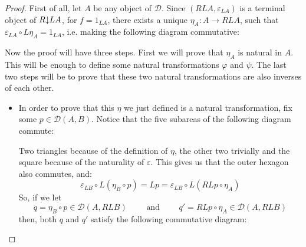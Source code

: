 \begin{proof} First of all, let $A$ be any object of $\mathcal{D}$. Since $(RLA,\varepsilon_{LA})$ is a terminal object of $\commaCat{R}{LA}$, for $f=1_{LA}$, there exists a unique $\eta_A:A\to RLA$, such that $\varepsilon_{LA}\circ L\eta_A=1_{LA}$, i.e. making the following diagram commutative:
\begin{center}
\end{center}
Now the proof will have three steps. First we will prove that $\eta_A$ is natural in $A$. This will be enough to define some natural transformations $\varphi$ and $\psi$. The last two steps will be to prove that these two natural transformations are also inverses of each other.
\begin{itemize}
\item In order to prove that this $\eta$ we just defined is a natural transformation, fix some $p\in\mathcal{D}(A,B)$. Notice that the five subareas of the following diagram commute:
\begin{center}
\end{center}
Two triangles because of the definition of $\eta$, the other two trivially and the square because of the naturality of $\varepsilon$. This gives us that the outer hexagon also commutes, and:
\[\varepsilon_{LB}\circ L(\eta_B\circ p)=Lp=\varepsilon_{LB}\circ L(RLp\circ\eta_A)\]
So, if we let
\[q=\eta_B\circ p\in\mathcal{D}(A,RLB)\qquad\text{ and }\qquad q'=RLp\circ\eta_A\in\mathcal{D}(A,RLB)\]
then, both $q$ and $q'$ satisfy the following commutative diagram:
\begin{center}
\begin{tikzcd}

\end{tikzcd}
\end{center}
\end{itemize}
\end{proof}
